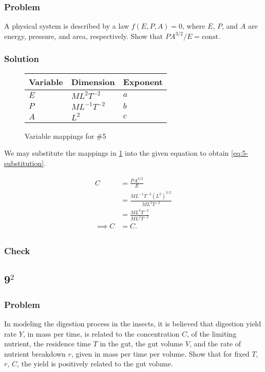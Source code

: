 \documentclass[12pt]{article}
\begin{document}
  \subsubsection*{Problem}
  A physical system is described by a law $f(E,P,A)=0$, where $E$, $P$, and $A$
  are energy, pressure, and area, respectively. Show that $PA^{3/2}/E=\text{const}$.

  \subsubsection*{Solution}
  \begin{figure}
    \centering
    \begin{tabularx}{0.5\textwidth}{XXX}
      Variable & Dimension & Exponent \\ \hline
      $E$ & $ML^2T^{-2}$ & $a$ \\
      $P$ & $ML^{-1}T^{-2}$ & $b$ \\
      $A$ & $L^2$ & $c$ \\
    \end{tabularx}
    \caption{Variable mappings for \#5}
    \label{fig:5-var-mappings}
  \end{figure}

  We may substitute the mappings in \cref{fig:5-var-mappings} into the given
  equation to obtain \cref{eq:5-substitution}.

  \begin{equation}
    \label{eq:5-substitution}
    \boxed{
    \begin{aligned}
      C &= \frac{PA^{3/2}}{E} \\
        &= \frac{ML^{-1}T^{-2}(L^2)^{3/2}}{ML^2T^{-2}} \\
        &= \frac{ML^2T^{-2}}{ML^2T^{-2}} \\
      \implies C &= C. \\
    \end{aligned}
    }
  \end{equation}

  \subsubsection*{Check}
  \todo

  \newpage
\subsection{9$^2$}
  \subsubsection*{Problem}
  In modeling the digestion process in the insects, it is believed that
  digestion yield rate $Y$, in mass per time, is related to the concentration
  $C$, of the limiting nutrient, the residence time $T$ in the gut, the gut
  volume $V$, and the rate of nutrient breakdown $r$, given in mass per time per
  volume. Show that for fixed $T$, $r$, $C$, the yield is positively related to
  the gut volume.
\end{document}
